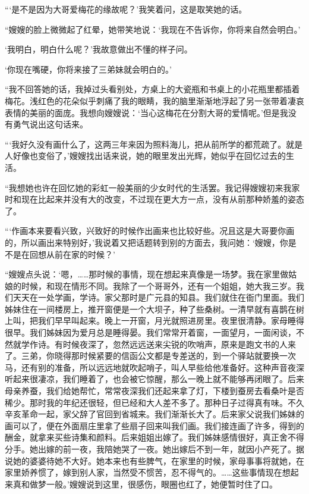 {    \par “‘是不是因为大哥爱梅花的缘故呢？’我笑着问，这是取笑她的话。
    \par “嫂嫂的脸上微微起了红晕，她带笑地说：‘我现在不告诉你，你将来自然会明白。’
    \par ‘我明白，明白什么呢？’我故意做出不懂的样子问。
    \par ‘你现在嘴硬，你将来接了三弟妹就会明白的。’
    \par “我不回答她的话，我掉过头看别处，方桌上的大瓷瓶和书桌上的小花瓶里都插着梅花。浅红色的花朵似乎刺痛了我的眼睛，我的脑里渐渐地浮起了另一张带着凄哀表情的美丽的面庞。我想向嫂嫂说：‘当心这梅花在分割大哥的爱情呢。’但是我没有勇气说出这句话来。
    \par “‘我好久没有画什么了，这两三年来因为照料海儿，把从前所学的都荒疏了。就是人好像也变俗了，’嫂嫂找出话来说，她的眼里发出光辉，她似乎在回忆过去的生活。
    \par “我想她也许在回忆她的彩虹一般美丽的少女时代的生活罢。我记得嫂嫂初来我家时和现在比起来并没有大的改变，不过现在更大方一点，没有从前那种娇羞的姿态了。
    \par “‘作画本来要看兴致，兴致好的时候作出画来也比较好些。况且这是大哥要你画的，所以画出来特别好，’我说着又把话题转到别的方面去，我问她：‘嫂嫂，你是不是在回想从前在家的时候？’
    \par “嫂嫂点头说：‘嗯，……那时候的事情，现在想起来真像是一场梦。我在家里做姑娘的时候，和现在情形不同。我除了一个哥哥外，还有一个姐姐，她大我三岁。我们天天在一处学画，学诗。家父那时是广元县的知县。我们就住在衙门里面。我们姊妹住在一间楼房上，推开窗便是一个大坝子，种了些桑树。一清早就有喜鹊在树上叫，把我们早早叫起来。晚上一开窗，月光就照进房里。夜里很清静。家母睡得很早。我们姊妹因为爱月总是睡得晏。我们常常开着窗，一面望月，一面闲谈，不然就学作诗。有时候夜深了，忽然远远送来尖锐的吹哨声，原来是跑文书的人来了。三弟，你晓得那时候紧要的信函公文都是专差送的，到一个驿站就要换一次马，还有别的准备，所以远远地就吹起哨子，叫人早些给他准备好。这种声音夜深听起来很凄凉，我们睡着了，也会被它惊醒，那么一晚上就不能够再闭眼了。后来母亲养蚕，我们给她帮忙，常常夜深我们还起来拿了灯，下楼到蚕房去看桑叶是否稀少。那时我的年纪还很轻，但已经和大人差不多了。那种日子过得真有味。不久辛亥革命一起，家父辞了官回到省城来。我们渐渐长大了。后来家父说我们姊妹的画可以了，便在外面扇庄里拿了些扇子回来叫我们画。我们接连画了许多，得到的酬金，就拿来买些诗集和颜料。后来姐姐出嫁了。我们姊妹感情很好，真正舍不得分手。她出嫁的前一夜，我陪她哭了一夜。她出嫁后不到一年，就因小产死了。据说她的婆婆待她不大好。她本来也有些脾气，在家里的时候，家母事事将就她，在家里娇养惯了，嫁到别人家，当然受不惯苦，忍不得气的。……这些事情现在想起来真和做梦一般。’嫂嫂说到这里，很感伤，眼圈也红了，她便暂时住了口。
}
